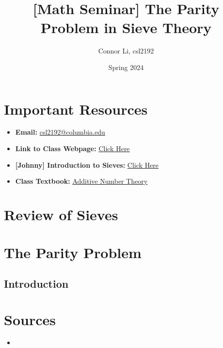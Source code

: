 \documentclass[8pt]{extarticle}
\title{[Math Seminar] The Parity Problem in Sieve Theory}
\author{Connor Li, csl2192}
\date{Spring 2024}
\begin{document}
\maketitle

\maketitle

\section*{Important Resources}
\begin{itemize}
    \item \textbf{Email:} \href{mailto:csl2192@columbia.edu}{csl2192@columbia.edu}
    \item \textbf{Link to Class Webpage:} \href{https://www.math.columbia.edu/~avizeff/additive/index.html}{Click Here}
    \item \textbf{[Johnny] Introduction to Sieves:} \href{https://www.math.columbia.edu/~avizeff/additive/talk_10.pdf}{Click Here}
    \item \textbf{Class Textbook:} \href{http://www.alefenu.com/libri/nathansonbases.pdf}{Additive Number Theory}
\end{itemize}

\tableofcontents   


\pagebreak
\section{Review of Sieves}
\section{The Parity Problem}
\subsection{Introduction}



\pagebreak
\section{Sources}
\begin{itemize}
    \item 
\end{itemize}
\end{document}
